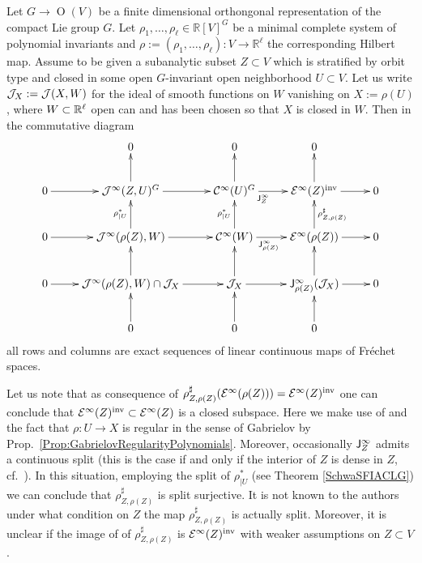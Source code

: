 \begin{theorem} \label{maindiag} Let $G\to \operatorname{O}(V)$ be a finite dimensional 
orthongonal representation of the compact Lie group $G$.  Let 
$\rho_1,\dots,\rho_\ell\in\mathbb R[V]^G$  be a minimal complete system of polynomial 
invariants and $\rho:=(\rho_1,\dots,\rho_\ell): V\to \mathbb R^\ell$ the corresponding 
Hilbert map. Assume to be given a subanalytic subset $Z\subset V$ which is  stratified by orbit type 
and closed in some open $G$-invariant open neighborhood $U \subset V$. 
Let us write $\mathcal{J}_X:=\mathcal{J}(X,W)$ for the ideal of smooth functions on $W$ vanishing on $X:= \rho (U)$, where
$W \subset \mathbb{R}^\ell$ open can and has been chosen so that $X$ is closed in $W$.  
Then in the commutative diagram
\begin{eqnarray*}
\xymatrix{&0&0&0&\\
0\ar[r]&\calJ ^\infty(Z,U)^G\ar[u]\ar[r]&\calC^\infty(U)^G\ar[u]\ar[r]_{\sfJ^\infty_{Z}\quad\quad}&\calE^\infty(Z)^\textup{inv}\ar[u]\ar[r]&0\\
0\ar[r]&\calJ ^\infty(\rho(Z), W)\ar[u]^{\rho^*_{|U}}\ar[r]&\calC^\infty(W)\ar[u]^{\rho^*_{|U}}\ar[r]_{\sfJ^\infty_{\rho(Z)}\quad}&\calE^\infty(\rho(Z))\ar[u]_{\rho^{\sharp}_{Z,\rho(Z)}}\ar[r]&0\\
0\ar[r]&\calJ ^\infty(\rho(Z), W)\cap \calJ_X \ar[u]\ar[r]& \calJ_X \ar[u]\ar[r]&\sfJ^\infty_{\rho(Z)}(\calJ_X)\ar[u]\ar[r]&0\\
&0\ar[u]&0\ar[u]&0\ar[u]&
}
\end{eqnarray*}
all rows and columns are exact sequences of linear continuous maps of Fr{\'e}chet spaces.
\end{theorem}


\begin{remark}
 Let us note that as  consequence of $\rho^{\sharp}_{Z,{\rho(Z)}}(\mathcal{E}^\infty(\rho(Z)))=\mathcal{E}^\infty(Z)^\textup{inv} $ one can conclude that 
 $\mathcal{E}^\infty(Z)^\textup{inv}\subset \mathcal{E}^\infty(Z)$ is a closed subspace. Here we make use of \cite[Theorem 3.6]{BieMilCDF} and the 
 fact that $\rho:U\to X$ is regular in the sense of Gabrielov by Prop.~\ref{Prop:GabrielovRegularityPolynomials}. Moreover, 
 occasionally $\mathsf{J}^\infty_Z$ admits a continuous split (this is the case if and only if the interior of $Z$ is dense in $Z$, 
 cf.~\cite{BieEWFSS}). In this situation, employing the split of $\rho_{|U}^*$ (see Theorem \ref{SchwaSFIACLG}) we can conclude that 
 $\rho^{\sharp}_{Z,{\rho(Z)}}$ is split surjective. It is not known to the authors under what condition on $Z$ the map 
 $\rho^{\sharp}_{Z,\rho(Z)}$ is actually split. Moreover, it is unclear if the image of 
 of $\rho^{\sharp}_{Z,{\rho(Z)}}$ is $\mathcal{E}^\infty(Z)^\textup{inv}$ with weaker assumptions on $Z\subset V$.
\end{remark}


